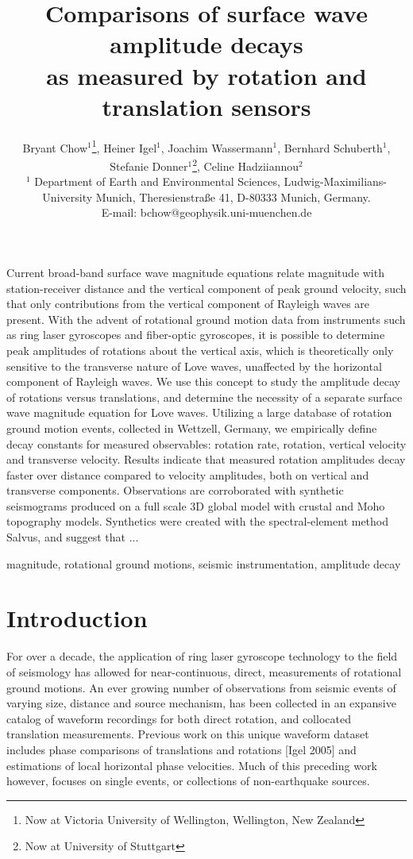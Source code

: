 \documentclass{gji}
\title[Comparisons of surface wave amplitude decays]
  {Comparisons of surface wave amplitude decays \\as measured by rotation and translation sensors}
\author[Bryant Chow]
  {Bryant Chow$^1$\thanks{Now at Victoria University of Wellington, Wellington, New Zealand}, 
  Heiner Igel$^1$, 
  Joachim Wassermann$^1$,
  Bernhard Schuberth$^1$,
  Stefanie Donner$^1$\thanks{Now at University of Stuttgart},
  Celine Hadziiannou$^2$ \\
  $^1$ Department of Earth and Environmental Sciences, Ludwig-Maximilians-University Munich, Theresienstra\ss e 41, D-80333 Munich, Germany. \\E-mail: bchow@geophysik.uni-muenchen.de
  }
\date{}
\begin{document}
\label{firstpage}

\maketitle

\begin{summary}
Current broad-band surface wave magnitude equations relate magnitude with station-receiver distance and the vertical component of peak ground velocity, such that only contributions from the vertical component of Rayleigh waves are present. With the advent of rotational ground motion data from instruments such as ring laser gyroscopes and fiber-optic gyroscopes, it is possible to determine peak amplitudes of rotations about the vertical axis, which is theoretically only sensitive to the transverse nature of Love waves, unaffected by the horizontal component of Rayleigh waves. We use this concept to study the amplitude decay of rotations versus translations, and determine the necessity of a separate surface wave magnitude equation for Love waves. Utilizing a large database of rotation ground motion events, collected in Wettzell, Germany, we empirically define decay constants for measured observables: rotation rate, rotation, vertical velocity and transverse velocity. Results indicate that measured rotation amplitudes decay faster over distance compared to velocity amplitudes, both on vertical and transverse components. Observations are corroborated with synthetic seismograms produced on a full scale 3D global model with crustal and Moho topography models. Synthetics were created with the spectral-element method Salvus, and suggest that ...
\end{summary}

\begin{keywords}
magnitude, rotational ground motions, seismic instrumentation, amplitude decay
\end{keywords}

\section{Introduction} 
For over a decade, the application of ring laser gyroscope technology to the field of seismology has allowed for near-continuous, direct, measurements of rotational ground motions. An ever growing number of observations from seismic events of varying size, distance and source mechanism, has been collected in an expansive catalog of waveform recordings for both direct rotation, and collocated translation measurements.
Previous work on this unique waveform dataset includes phase comparisons of translations and rotations [Igel 2005] %
and estimations of local horizontal phase velocities. %
Much of this preceding work however, focuses on single events, or collections of non-earthquake sources. 
\end{document}
